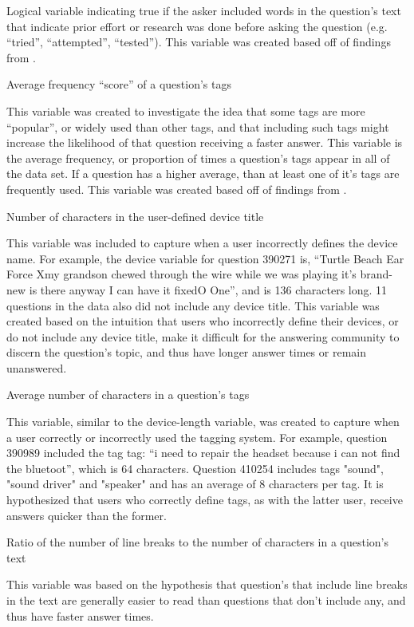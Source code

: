 \documentclass{article}
\begin{document}
Logical variable indicating true if the asker included words in the question's text that indicate prior effort or research was done before asking the question (e.g. ``tried'', ``attempted'', ``tested''). This variable was created based off of findings from \cite{Bhat2014}. 

Average frequency ``score'' of a question's tags

This variable was created to investigate the idea that some tags are more ``popular'', or widely used than other tags, and that including such tags might increase the likelihood of that question receiving a faster answer. This variable is the average frequency, or proportion of times a question's tags appear in all of the data set. If a question has a higher average, than at least one of it's tags are frequently used. This variable was created based off of findings from \cite{Bhat2014}. 

Number of characters in the user-defined device title

This variable was included to capture when a user incorrectly defines the device name. For example, the device variable for question 390271 is, “Turtle Beach Ear Force Xmy grandson chewed through the wire while we was playing it's brand-new is there anyway I can have it fixedO One”, and is 136 characters long. 11 questions in the data also did not include any device title. This variable was created based on the intuition that users who incorrectly define their devices, or do not include any device title, make it difficult for the answering community to discern the question's topic, and thus have longer answer times or remain unanswered.

Average number of characters in a question's tags

This variable, similar to the device-length variable, was created to capture when a user correctly or incorrectly used the tagging system. For example, question 390989 included the tag tag: “i need to repair the headset because i can not find the bluetoot”, which is 64 characters. Question 410254 includes tags "sound", "sound driver" and "speaker" and has an average of 8 characters per tag. It is hypothesized that users who correctly define tags, as with the latter user, receive answers quicker than the former. 

Ratio of the number of line breaks to the number of characters in a question's text

This variable was based on the hypothesis that question's that include line breaks in the text are generally easier to read than questions that don't include any, and thus have faster answer times. 



\end{document}

